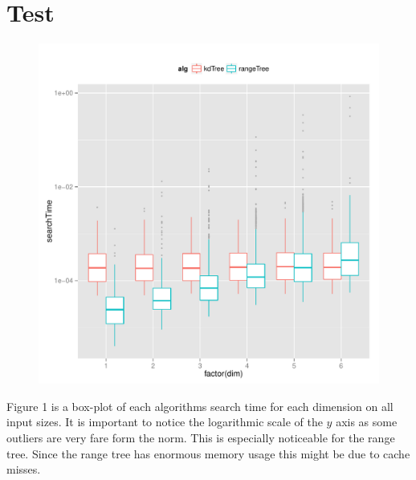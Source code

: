 \documentclass{article}
\begin{document}
 \section{Test}
\begin{figure}[H]
    \centering
    \includegraphics[width=\textwidth]{../src/R/plots/boxplot.pdf}
    \caption{}
\end{figure}
Figure 1 is a box-plot of each algorithms search time for each dimension on all 
input sizes. It is important to notice the logarithmic scale of the $y$ axis as 
some outliers are very fare form the norm. This is especially noticeable for the 
range tree. Since the range tree has enormous memory usage this might be due to 
cache misses.
\end{document}
